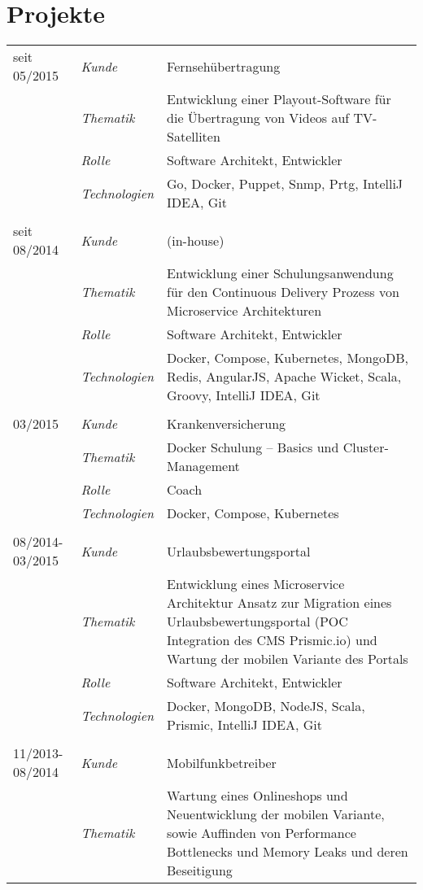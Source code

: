 \section*{Projekte}
\renewcommand{\arraystretch}{1.3}
\begin{longtable}{@{}>{}p{4cm}>{\itshape}p{2cm}>{}p{9cm}}
seit 05/2015        & Kunde 	    & Fernsehübertragung\\
\nopagebreak		& Thematik	    & Entwicklung einer Playout-Software für die Übertragung von Videos auf TV-Satelliten\\
\nopagebreak		& Rolle 	    & Software Architekt, Entwickler\\
\nopagebreak		& Technologien	& Go, Docker, Puppet, Snmp, Prtg, IntelliJ IDEA, Git\\
\\
seit 08/2014        & Kunde 	    & (in-house)\\
\nopagebreak		& Thematik	    & Entwicklung einer Schulungsanwendung für den Continuous Delivery Prozess von Microservice Architekturen\\
\nopagebreak		& Rolle 	    & Software Architekt, Entwickler\\
\nopagebreak		& Technologien	& Docker, Compose, Kubernetes, MongoDB, Redis, AngularJS, Apache Wicket, Scala, Groovy, IntelliJ IDEA, Git\\
\\
03/2015             & Kunde 	    & Krankenversicherung\\
\nopagebreak		& Thematik	    & Docker Schulung – Basics und Cluster-Management\\
\nopagebreak		& Rolle 	    & Coach\\
\nopagebreak		& Technologien	& Docker, Compose, Kubernetes\\
\\
08/2014-03/2015     & Kunde 	    & Urlaubsbewertungsportal\\
\nopagebreak		& Thematik	    & Entwicklung eines Microservice Architektur Ansatz zur Migration eines Urlaubsbewertungsportal (POC Integration des CMS Prismic.io) und Wartung der mobilen Variante des Portals\\
\nopagebreak		& Rolle 	    & Software Architekt, Entwickler\\
\nopagebreak		& Technologien	& Docker, MongoDB, NodeJS, Scala, Prismic, IntelliJ IDEA, Git\\
\\
11/2013-08/2014     & Kunde 	    & Mobilfunkbetreiber\\
\nopagebreak		& Thematik	    & Wartung eines Onlineshops und Neuentwicklung der mobilen Variante, sowie Auffinden von Performance Bottlenecks und Memory Leaks und deren Beseitigung\\

\end{longtable}
